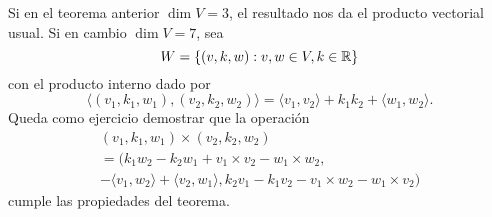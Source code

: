 Si en el teorema anterior $\dim V=3$, el resultado nos da el producto vectorial usual. Si en cambio $\dim V=7$, 
sea 
\[
	W=\{(v,k,w):v,w\in V,k\in\mathbb{R}\}
\]
con el producto interno dado por
\[
	\langle (v_1,k_1,w_1),(v_2,k_2,w_2)\rangle = \langle v_1,v_2\rangle+k_1k_2+\langle w_1,w_2\rangle.
\]
Queda como ejercicio demostrar que la operación
\begin{multline*}
	(v_1,k_1,w_1)\times (v_2,k_2,w_2)\\
	=(k_1w_2-k_2w_1+v_1\times v_2-w_1\times w_2,
	\\-\langle v_1,w_2\rangle+\langle v_2,w_1\rangle, 
	k_2v_1-k_1v_2-v_1\times w_2-w_1\times v_2)
\end{multline*}
cumple las propiedades del teorema.